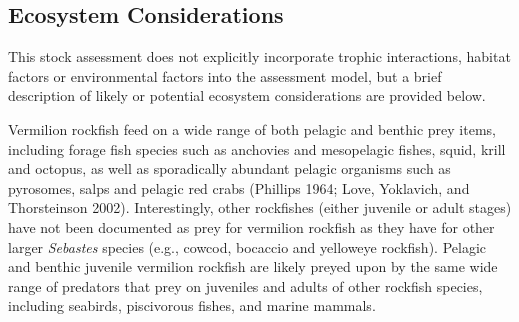 \documentclass[11pt,
  english,
  a4paper,
]{article}
\begin{document}
\leavevmode\tagmcend\tagstructend\par


\hypertarget{ecosystem-considerations-1}{%
\subsection{Ecosystem Considerations}\label{ecosystem-considerations-1}}

\leavevmode\tagmcend\tagstructend


This stock assessment does not explicitly incorporate trophic interactions, habitat factors or environmental factors into the assessment model, but a brief description of likely or potential ecosystem considerations are provided below.

\leavevmode\tagmcend\tagstructend\par


Vermilion rockfish feed on a wide range of both pelagic and benthic prey items, including forage fish species such as anchovies and mesopelagic fishes, squid, krill and octopus, as well as sporadically abundant pelagic organisms such as pyrosomes, salps and pelagic red crabs {(Phillips 1964; Love, Yoklavich, and Thorsteinson 2002)\leavevmode\tagmcend\tagstructend}. Interestingly, other rockfishes (either juvenile or adult stages) have not been documented as prey for vermilion rockfish as they have for other larger \emph{Sebastes} species (e.g., cowcod, bocaccio and yelloweye rockfish). Pelagic and benthic juvenile vermilion rockfish are likely preyed upon by the same wide range of predators that prey on juveniles and adults of other rockfish species, including seabirds, piscivorous fishes, and marine mammals.

\leavevmode\tagmcend\tagstructend\par

\end{document}
